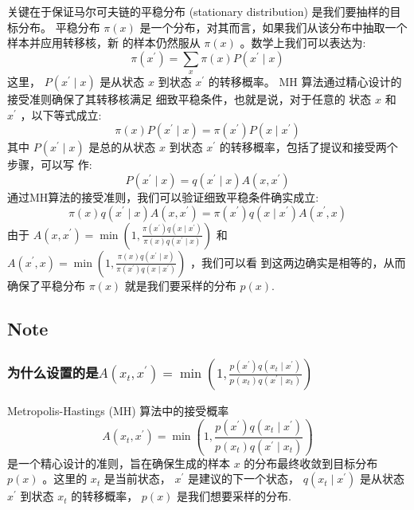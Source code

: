 \documentclass[UTF8,12pt]{ctexart}
\numberwithin{equation}{section}%
\begin{document}
	关键在于保证马尔可夫链的平稳分布 (stationary distribution) 是我们要抽样的目标分布。 平稳分布 $\pi(x)$ 是一个分布，对其而言，如果我们从该分布中抽取一个样本并应用转移核，新 的样本仍然服从 $\pi(x)$ 。数学上我们可以表达为:
	$$
	\pi\left(x^{\prime}\right)=\sum_x \pi(x) P\left(x^{\prime} \mid x\right)
	$$
	这里， $P\left(x^{\prime} \mid x\right)$ 是从状态 $x$ 到状态 $x^{\prime}$ 的转移概率。
	$\mathrm{MH}$ 算法通过精心设计的接受准则确保了其转移核满足{\color{brown} 细致平稳条件}，也就是说，对于任意的 状态 $x$ 和 $x^{\prime}$ ，以下等式成立:
	$$
	\pi(x) P\left(x^{\prime} \mid x\right)=\pi\left(x^{\prime}\right) P\left(x \mid x^{\prime}\right)
	$$	
	其中 $P\left(x^{\prime} \mid x\right)$ 是总的从状态 $x$ 到状态 $x^{\prime}$ 的转移概率，包括了提议和接受两个步骤，可以写 作:
	$$
	P\left(x^{\prime} \mid x\right)=q\left(x^{\prime} \mid x\right) A\left(x, x^{\prime}\right)
	$$
	通过MH算法的接受准则，我们可以验证细致平稳条件确实成立:
	$$
	\pi(x) q\left(x^{\prime} \mid x\right) A\left(x, x^{\prime}\right)=\pi\left(x^{\prime}\right) q\left(x \mid x^{\prime}\right) A\left(x^{\prime}, x\right)
	$$
	由于 $A\left(x, x^{\prime}\right)=\min \left(1, \frac{\pi\left(x^{\prime}\right) q\left(x \mid x^{\prime}\right)}{\pi(x) q\left(x^{\prime} \mid x\right)}\right)$ 和 $A\left(x^{\prime}, x\right)=\min \left(1, \frac{\pi(x) q\left(x^{\prime} \mid x\right)}{\pi\left(x^{\prime}\right) q\left(x \mid x^{\prime}\right)}\right)$ ，我们可以看 到这两边确实是相等的，从而确保了平稳分布 $\pi(x)$ 就是我们要采样的分布 $p(x)$.
	
	\subsection{Note}
	\subsubsection{为什么设置的是$	A\left(x_t, x^{\prime}\right)=\min \left(1, \frac{p\left(x^{\prime}\right) q\left(x_t \mid x^{\prime}\right)}{p\left(x_t\right) q\left(x^{\prime} \mid x_t\right)}\right)$}
	
	Metropolis-Hastings (MH) 算法中的接受概率
	$$
	A\left(x_t, x^{\prime}\right)=\min \left(1, \frac{p\left(x^{\prime}\right) q\left(x_t \mid x^{\prime}\right)}{p\left(x_t\right) q\left(x^{\prime} \mid x_t\right)}\right)
	$$
	是一个精心设计的准则，旨在确保生成的样本 $x$ 的分布最终收敛到目标分布 $p(x)$ 。这里的 $x_t$ 是当前状态， $x^{\prime}$ 是建议的下一个状态， $q\left(x_t \mid x^{\prime}\right)$ 是从状态 $x^{\prime}$ 到状态 $x_t$ 的转移概率， $p(x)$ 是我们想要采样的分布.
	
\end{document}
